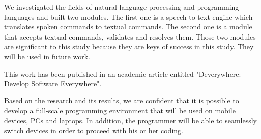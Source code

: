 We investigated the fields of natural language processing and programming languages and built two modules. The first one is a speech to text engine which translates spoken commands to textual commands. The second one is a module that accepts textual commands, validates and resolves them. Those two modules are significant to this study because they are keys of success in this study. They will be used in future work.

This work has been published in an academic article entitled "Deverywhere: Develop Software Everywhere".

Based on the research and its results, we are confident that it is possible to develop a full-scale programming environment that will be used on mobile devices, PCs and laptops. In addition, the programmer will be able to seamlessly switch devices in order to proceed with his or her coding.